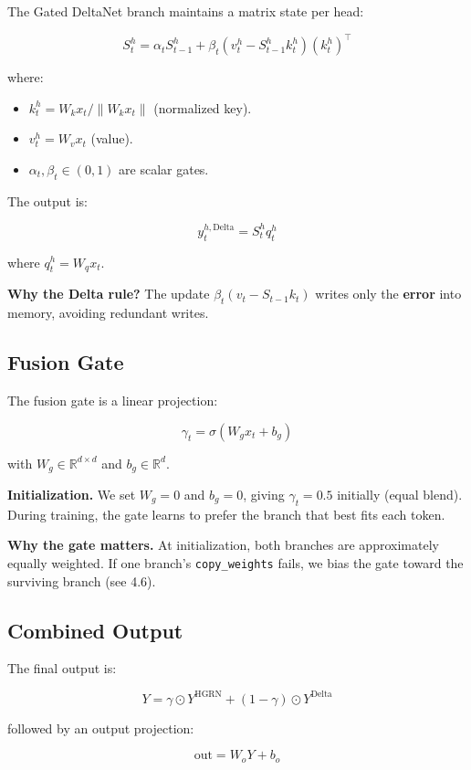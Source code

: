 The Gated DeltaNet branch maintains a matrix state per head:

\[
S_t^h = \alpha_t S_{t-1}^h + \beta_t (v_t^h - S_{t-1}^h k_t^h) (k_t^h)^\top
\tag{4.4}
\]

where:

\begin{itemize}
\item $k_t^h = W_k x_t / \|W_k x_t\|$ (normalized key).
\item $v_t^h = W_v x_t$ (value).
\item $\alpha_t, \beta_t \in (0, 1)$ are scalar gates.

\end{itemize}
The output is:

\[
y_t^{h, \text{Delta}} = S_t^h q_t^h
\tag{4.5}
\]

where $q_t^h = W_q x_t$.

\textbf{Why the Delta rule?} The update $\beta_t (v_t - S_{t-1} k_t)$ writes only 
the \textbf{error} into memory, avoiding redundant writes.

\subsection{Fusion Gate}

The fusion gate is a linear projection:

\[
\gamma_t = \sigma(W_g x_t + b_g)
\tag{4.6}
\]

with $W_g \in \mathbb{R}^{d \times d}$ and $b_g \in \mathbb{R}^d$.

\textbf{Initialization.} We set $W_g = 0$ and $b_g = 0$, giving 
$\gamma_t = 0.5$ initially (equal blend). During training, the gate learns 
to prefer the branch that best fits each token.

\textbf{Why the gate matters.} At initialization, both branches are 
approximately equally weighted. If one branch's \texttt{copy\_weights} fails, we 
bias the gate toward the surviving branch (see  4.6).

\subsection{Combined Output}

The final output is:

\[
Y = \gamma \odot Y^\text{HGRN} + (1 - \gamma) \odot Y^\text{Delta}
\tag{4.7}
\]

followed by an output projection:

\[
\text{out} = W_o Y + b_o
\tag{4.8}
\]

